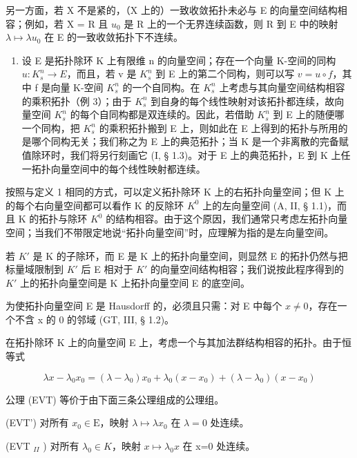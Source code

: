 另一方面，若 X 不是紧的，（X 上的）一致收敛拓扑未必与 E 的向量空间结构相容；例如，若 X = R 且 \(u_{0}\) 是 R 上的一个无界连续函数，则 R 到 E 中的映射 \(\lambda \mapsto \lambda u_{0}\) 在 E 的一致收敛拓扑下不连续。

\begin{enumerate}
\def\labelenumi{\arabic{enumi})}
\setcounter{enumi}{4}
\tightlist
\item
  设 E 是拓扑除环 K 上有限维 n 的向量空间；存在一个向量 K-空间的同构 \(u:K_{s}^{n}\to E\)，而且，若 v 是 \(K_{s}^{n}\) 到 E 上的第二个同构，则可以写 \(v=u\circ f\)，其中 f 是向量 K-空间 \(K_{s}^{n}\) 的一个自同构。在 \(K_{s}^{n}\) 上考虑与其向量空间结构相容的乘积拓扑（例 3）；由于 \(K_{s}^{n}\) 到自身的每个线性映射对该拓扑都连续，故向量空间 \(K_{s}^{n}\) 的每个自同构都是双连续的。因此，若借助 \(K_{s}^{n}\) 到 E 上的随便哪一个同构，把 \(K_{s}^{n}\) 的乘积拓扑搬到 E 上，则如此在 E 上得到的拓扑与所用的是哪个同构无关；我们称之为 E 上的典范拓扑；当 K 是一个非离散的完备赋值除环时，我们将另行刻画它 (I, § 1.3)。对于 E 上的典范拓扑，E 到 K 上任一拓扑向量空间中的每个线性映射都连续。
\end{enumerate}

按照与定义 1 相同的方式，可以定义拓扑除环 K 上的右拓扑向量空间；但 K 上的每个右向量空间都可以看作 K 的反除环 \(K^{0}\) 上的左向量空间 (A, II, § 1.1)，而且 K 的拓扑与除环 \(K^{0}\) 的结构相容。由于这个原因，我们通常只考虑左拓扑向量空间；当我们不带限定地说“拓扑向量空间”时，应理解为指的是左向量空间。

若 \(K'\) 是 K 的子除环，而 E 是 K 上的拓扑向量空间，则显然 E 的拓扑仍然与把标量域限制到 \(K'\) 后 E 相对于 \(K'\) 的向量空间结构相容；我们说按此程序得到的 \(K'\) 上的拓扑向量空间是 K 上拓扑向量空间 E 的底空间。

为使拓扑向量空间 E 是 Hausdorff 的，必须且只需：对 E 中每个 \(x \neq 0\)，存在一个不含 x 的 0 的邻域 (GT, III, § 1.2)。

在拓扑除环 K 上的向量空间 E 上，考虑一个与其加法群结构相容的拓扑。由于恒等式

\[
\lambda x - \lambda_ {0} x _ {0} = (\lambda - \lambda_ {0}) x _ {0} + \lambda_ {0} (x - x _ {0}) + (\lambda - \lambda_ {0}) (x - x _ {0})
\]

公理 (EVT) 等价于由下面三条公理组成的公理组。

(EVT') 对所有 \(x_0 \in \mathrm{E}\)，映射 \(\lambda \mapsto \lambda x_0\) 在 \(\lambda = 0\) 处连续。

(EVT \(_{II}\) ) 对所有 \(\lambda_{0}\in K\)，映射 \(x\mapsto\lambda_{0}x\) 在 x=0 处连续。

